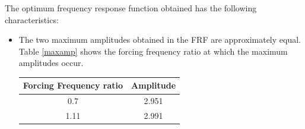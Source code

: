 \par
The optimum frequency response function obtained has the following characteristics:
\begin{itemize}
\item The two maximum amplitudes obtained in the FRF are approximately equal. Table \ref{maxamp} shows the forcing frequency ratio at which the maximum amplitudes occur.
\begin{table}[h]
\centering
\begin{tabular}{|c|c|}
\hline
Forcing Frequency ratio & Amplitude \\ \hline
0.7 & 2.951 \\ \hline
1.11 & 2.991 \\ \hline
\end{tabular}
\end{table}
\end{itemize}